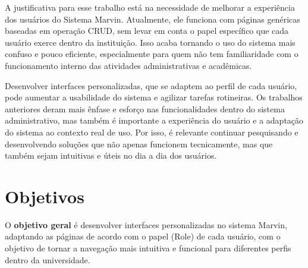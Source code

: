 A justificativa para esse trabalho está na necessidade de melhorar a experiência dos usuários do Sistema Marvin. Atualmente, ele funciona com páginas genéricas baseadas em operação CRUD, sem levar em conta o papel específico que cada usuário exerce dentro da instituição. Isso acaba tornando o uso do sistema mais confuso e pouco eficiente, especialmente para quem não tem familiaridade com o funcionamento interno das atividades administrativas e acadêmicas.

Desenvolver interfaces personalizadas, que se adaptem ao perfil de cada usuário, pode aumentar a usabilidade do sistema e agilizar tarefas rotineiras. Os trabalhos anteriores deram mais ênfase e esforço nas funcionalidades dentro do sistema administrativo, mas também é importante a experiência do usuário e a adaptação do sistema ao contexto real de uso. Por isso, é relevante continuar pesquisando e desenvolvendo soluções que não apenas funcionem tecnicamente, mas que também sejam intuitivas e úteis no dia a dia dos usuários.

\section{Objetivos}
\label{sec-intro-obj}



O \textbf{objetivo geral} é desenvolver interfaces personalizadas no sistema Marvin, adaptando as páginas de acordo com o papel (Role) de cada usuário, com o objetivo de tornar a navegação mais intuitiva e funcional para diferentes perfis dentro da universidade.




